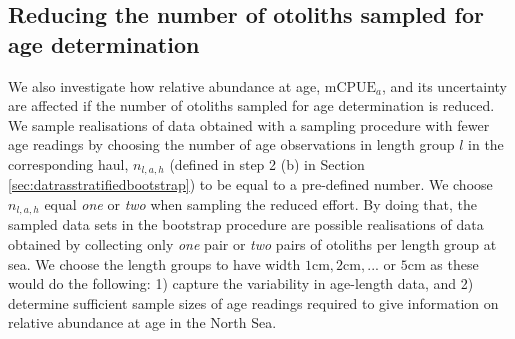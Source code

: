 \documentclass[a4paper 12pt]{article}
\numberwithin{equation}{section}
\begin{document}



\subsection{Reducing the number of otoliths sampled for age determination}
\label{sec:reducingeffort}
We also investigate how relative abundance at age, $\text{mCPUE}_a$, and its uncertainty are affected if the  number of otoliths sampled for age determination is reduced. We sample realisations of data obtained with a sampling procedure with fewer age readings by choosing the number of age observations in length group $l$ in the corresponding haul,  $n_{l,a,h}$ (defined in step 2 (b) in Section \ref{sec:datrasstratifiedbootstrap}) to be equal to a pre-defined number. We choose $n_{l,a,h}$ equal \textit{one} or \textit{two} when sampling the reduced effort. By doing that, the sampled data sets in the bootstrap procedure are possible realisations of data obtained by collecting only \textit{one} pair or \textit{two} pairs of otoliths per length group at sea. We choose the length groups to have width $1 \text{cm},2\text{cm},...\text{ or }5\text{cm}$ as these would do the following: 1) capture the variability in age-length data, and 2) determine sufficient sample sizes of age readings required to give information on relative abundance at age in the North Sea.
\end{document}
